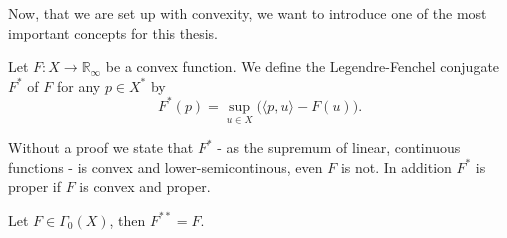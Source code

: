     Now, that we are set up with convexity, we want to introduce one of the most important concepts for this thesis.

    \begin{definition} %
    \label{def:legendre_fenchel_conjugate}

        Let $F: X \longrightarrow \mathbb{R}_{\infty}$ be a convex function. We define the Legendre-Fenchel conjugate $F^{\ast}$ of $F$ for any $p \in X^{\ast}$ by
            \begin{equation}
                F^{\ast}(p) = \sup_{u \in X} \big( \langle p, u \rangle - F(u) \big).
                \label{eq:legendre_fenchel_conjugate}
            \end{equation}

    \end{definition}

    \begin{remark} %
        Without a proof we state that $F^{\ast}$ - as the supremum of linear, continuous functions - is convex and lower-semicontinous, even $F$ is not. In addition $F^{\ast}$ is proper if $F$ is convex and proper.
    \end{remark}

    \begin{theorem} %
        Let $F \in \Gamma_{0}(X)$, then $F^{\ast\ast} = F$.
    \end{theorem}

